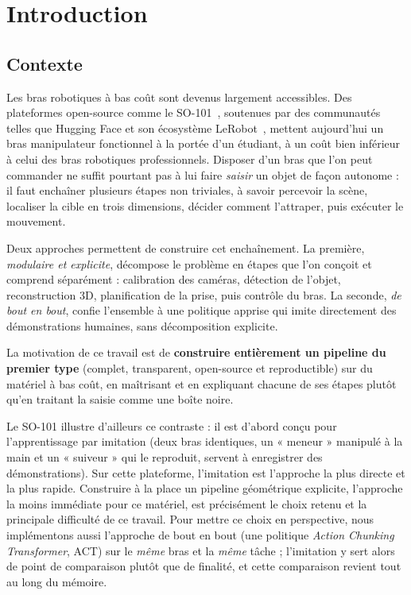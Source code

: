 \chapter{Introduction}

\section{Contexte}

Les bras robotiques à bas coût sont devenus largement accessibles. Des plateformes open-source comme le SO-101~\cite{therobotstudio_so101_2024}, soutenues par des communautés telles que Hugging Face et son écosystème LeRobot~\cite{cadene_lerobot_2024}, mettent aujourd'hui un bras manipulateur fonctionnel à la portée d'un étudiant, à un coût bien inférieur à celui des bras robotiques professionnels. Disposer d'un bras que l'on peut commander ne suffit pourtant pas à lui faire \emph{saisir} un objet de façon autonome : il faut enchaîner plusieurs étapes non triviales, à savoir percevoir la scène, localiser la cible en trois dimensions, décider comment l'attraper, puis exécuter le mouvement.

Deux approches permettent de construire cet enchaînement. La première, \emph{modulaire et explicite}, décompose le problème en étapes que l'on conçoit et comprend séparément : calibration des caméras, détection de l'objet, reconstruction 3D, planification de la prise, puis contrôle du bras. La seconde, \emph{de bout en bout}, confie l'ensemble à une politique apprise qui imite directement des démonstrations humaines, sans décomposition explicite.

La motivation de ce travail est de \textbf{construire entièrement un pipeline du premier type} (complet, transparent, open-source et reproductible) sur du matériel à bas coût, en maîtrisant et en expliquant chacune de ses étapes plutôt qu'en traitant la saisie comme une boîte noire.

Le SO-101 illustre d'ailleurs ce contraste : il est d'abord conçu pour l'apprentissage par imitation (deux bras identiques, un « meneur » manipulé à la main et un « suiveur » qui le reproduit, servent à enregistrer des démonstrations). Sur cette plateforme, l'imitation est l'approche la plus directe et la plus rapide. Construire à la place un pipeline géométrique explicite, l'approche la moins immédiate pour ce matériel, est précisément le choix retenu et la principale difficulté de ce travail. Pour mettre ce choix en perspective, nous implémentons aussi l'approche de bout en bout (une politique \textit{Action Chunking Transformer}, ACT) sur le \emph{même} bras et la \emph{même} tâche ; l'imitation y sert alors de point de comparaison plutôt que de finalité, et cette comparaison revient tout au long du mémoire.

